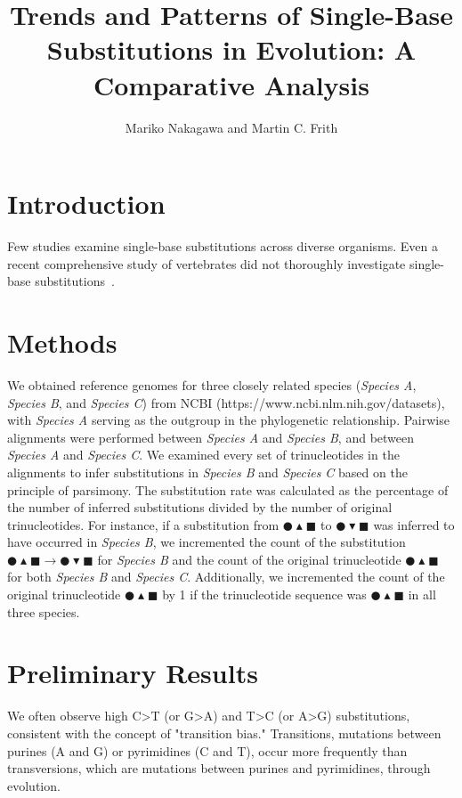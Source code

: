 \documentclass{article}
\title{Trends and Patterns of Single-Base Substitutions in Evolution: A Comparative Analysis}
\author{Mariko Nakagawa and Martin C. Frith}
\date{}
\newcommand{\Cir}{\CIRCLE} %
\newcommand{\Tri}{\blacktriangle} %
\newcommand{\dTri}{\blacktriangledown} %
\newcommand{\Squ}{\blacksquare} %
\begin{document}
\maketitle

\section{Introduction}

Few studies examine single-base substitutions across diverse organisms. Even a recent comprehensive study of vertebrates did not thoroughly investigate single-base substitutions~\cite{bergeron2023evolution}.

\section{Methods}
We obtained reference genomes for three closely related species (\textit{Species A}, \textit{Species B}, and \textit{Species C}) from NCBI (https://www.ncbi.nlm.nih.gov/datasets), with \textit{Species A} serving as the outgroup in the phylogenetic relationship. Pairwise alignments were performed between \textit{Species A} and \textit{Species B}, and between \textit{Species A} and \textit{Species C}. We examined every set of trinucleotides in the alignments to infer substitutions in \textit{Species B} and \textit{Species C} based on the principle of parsimony. The substitution rate was calculated as the percentage of the number of inferred substitutions divided by the number of original trinucleotides. For instance, if a substitution from $\Cir\Tri\Squ$ to $\Cir\dTri\Squ$ was inferred to have occurred in \textit{Species B}, we incremented the count of the substitution $\Cir\Tri\Squ \rightarrow \Cir\dTri\Squ$ for \textit{Species B} and the count of the original trinucleotide $\Cir\Tri\Squ$ for both \textit{Species B} and \textit{Species C}. Additionally, we incremented the count of the original trinucleotide $\Cir\Tri\Squ$ by 1 if the trinucleotide sequence was $\Cir\Tri\Squ$ in all three species.

\section{Preliminary Results}
We often observe high C>T (or G>A) and T>C (or A>G) substitutions, consistent with the concept of "transition bias." Transitions, mutations between purines (A and G) or pyrimidines (C and T), occur more frequently than transversions, which are mutations between purines and pyrimidines, through evolution.
\end{document}
